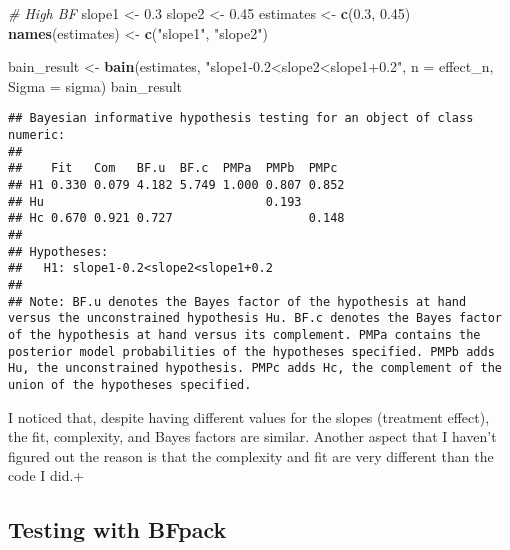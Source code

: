 \documentclass[
]{article}
\newenvironment{Shaded}{\begin{snugshade}}{\end{snugshade}}
\newcommand{\AttributeTok}[1]{\textcolor[rgb]{0.13,0.29,0.53}{#1}}
\newcommand{\CommentTok}[1]{\textcolor[rgb]{0.56,0.35,0.01}{\textit{#1}}}
\newcommand{\FloatTok}[1]{\textcolor[rgb]{0.00,0.00,0.81}{#1}}
\newcommand{\FunctionTok}[1]{\textcolor[rgb]{0.13,0.29,0.53}{\textbf{#1}}}
\newcommand{\NormalTok}[1]{#1}
\newcommand{\OtherTok}[1]{\textcolor[rgb]{0.56,0.35,0.01}{#1}}
\newcommand{\StringTok}[1]{\textcolor[rgb]{0.31,0.60,0.02}{#1}}
\begin{document}
\begin{Shaded}
\begin{Highlighting}[]
\CommentTok{\# High BF}
\NormalTok{slope1 }\OtherTok{\textless{}{-}} \FloatTok{0.3}
\NormalTok{slope2 }\OtherTok{\textless{}{-}} \FloatTok{0.45}
\NormalTok{estimates }\OtherTok{\textless{}{-}} \FunctionTok{c}\NormalTok{(}\FloatTok{0.3}\NormalTok{, }\FloatTok{0.45}\NormalTok{)}
\FunctionTok{names}\NormalTok{(estimates) }\OtherTok{\textless{}{-}} \FunctionTok{c}\NormalTok{(}\StringTok{"slope1"}\NormalTok{, }\StringTok{"slope2"}\NormalTok{)}

\NormalTok{bain\_result }\OtherTok{\textless{}{-}} \FunctionTok{bain}\NormalTok{(estimates, }\StringTok{"slope1{-}0.2\textless{}slope2\textless{}slope1+0.2"}\NormalTok{, }\AttributeTok{n =}\NormalTok{ effect\_n, }\AttributeTok{Sigma =}\NormalTok{ sigma)}
\NormalTok{bain\_result}
\end{Highlighting}
\end{Shaded}

\begin{verbatim}
## Bayesian informative hypothesis testing for an object of class numeric:
## 
##    Fit   Com   BF.u  BF.c  PMPa  PMPb  PMPc 
## H1 0.330 0.079 4.182 5.749 1.000 0.807 0.852
## Hu                               0.193      
## Hc 0.670 0.921 0.727                   0.148
## 
## Hypotheses:
##   H1: slope1-0.2<slope2<slope1+0.2
## 
## Note: BF.u denotes the Bayes factor of the hypothesis at hand versus the unconstrained hypothesis Hu. BF.c denotes the Bayes factor of the hypothesis at hand versus its complement. PMPa contains the posterior model probabilities of the hypotheses specified. PMPb adds Hu, the unconstrained hypothesis. PMPc adds Hc, the complement of the union of the hypotheses specified.
\end{verbatim}

I noticed that, despite having different values for the slopes
(treatment effect), the fit, complexity, and Bayes factors are similar.
Another aspect that I haven't figured out the reason is that the
complexity and fit are very different than the code I did.+

\subsection{Testing with BFpack}\label{testing-with-bfpack}
\end{document}
